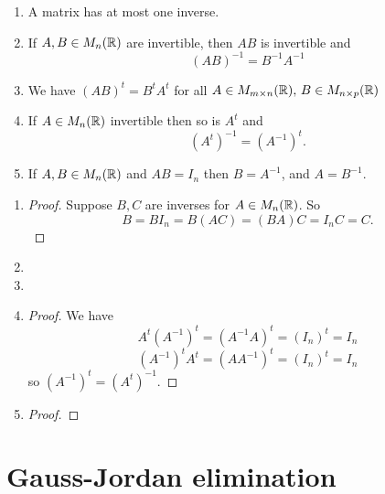 \documentclass[10pt, a4paper]{article}
\begin{document}
\begin{proposition}\phantom{}
    \begin{enumerate}[label = (\roman*)]
        \item A matrix has at most one inverse.
        \item If $A, B \in M_n(\mathbb{R})$ are invertible, then $AB$ is invertible and
        \[
        (AB) ^ {-1} = B^{-1}A^{-1}
        \]
        \item We have $(AB) ^ t = B ^ t A ^ t$ for all $A \in M_{m \times n}(\mathbb{R}),\, B \in M_{n \times p}(\mathbb{R})$
        \item If $A \in M_n(\mathbb{R})$ invertible then so is $A ^ t$ and
        \[
        (A ^ t)^{-1} = (A^{-1}) ^ t.
        \]
        \item If $A, B \in M_n(\mathbb{R})$ and $AB = I_n$ then $B = A^{-1}$, and $A = B^{-1}$.
    \end{enumerate}
    \begin{enumerate}[label = (\roman*)]
        \item
        \begin{proof}
        Suppose $B, C$ are inverses for $A \in M_{n}(\mathbb{R})$.
        So
        \[
        B = BI_n = B(AC) = (BA)C = I_n C = C.
        \]
        \end{proof}
        \item \phantom{}
        \item \phantom{}
        \item
        \begin{proof}
            We have
            \[
            A ^ t(A ^ {-1}) ^ t = (A ^ {-1} A) ^ t = (I_n) ^ t = I_n
            \]
            \[
            (A ^ {-1}) ^ t A ^ t = (A A ^ {-1}) ^ t = (I_n) ^ t = I_n
            \]
            so $(A ^ {-1}) ^ t = (A ^ t) ^ {-1}$.
        \end{proof}
        \item
        \begin{proof}
            
        \end{proof}
    \end{enumerate}
\end{proposition}

\newpage

\section{Gauss-Jordan elimination}
\end{document}
